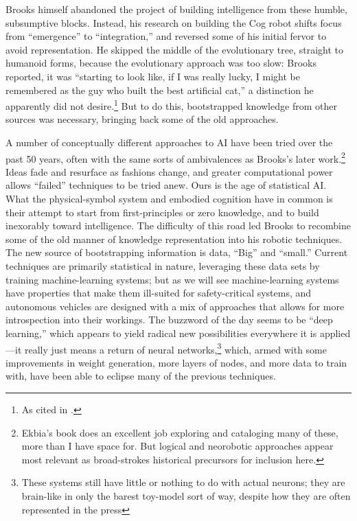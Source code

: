 Brooks himself abandoned the project of building intelligence from
these humble, subsumptive blocks. Instead, his research on building
the Cog robot shifts focus from ``emergence'' to ``integration,'' and
reversed some of his initial fervor to avoid representation.\cite[p.
  258]{ekbia} He skipped the middle of the evolutionary tree, straight
to humanoid forms, because the evolutionary approach was too slow: 
Brooks reported, it was ``starting to look like, if I was really
lucky, I might be remembered as the guy who built the best artificial
cat,'' a distinction he apparently did not desire.\cite[p.
  65]{brooksflesh}\footnote{As cited in \cite[p. 258]{ekbia}.}
But to do this, bootstrapped knowledge from other sources was
necessary, bringing back some of the old approaches.

A number of conceptually different approaches to AI have been tried
over the past 50 years, often with the same sorts of ambivalences as
Brooks's later work.\footnote{Ekbia's book does an excellent job
  exploring and cataloging many of these, more than I have space for.
  But logical and neorobotic approaches appear most relevant as
  broad-strokes historical precursors for inclusion here.} Ideas fade
and resurface as fashions change, and greater computational power
allows ``failed'' techniques to be tried anew. Ours is the age of
statistical AI. What the physical-symbol system and embodied cognition
have in common is their attempt to start from first-principles or zero
knowledge, and to build inexorably toward intelligence. The difficulty
of this road led Brooks to recombine some of the old manner of
knowledge representation into his robotic techniques. The new source
of bootstrapping information is data, ``Big'' and ``small.'' Current
techniques are primarily statistical in nature, leveraging these data
sets by training machine-learning systems; but as we will see
machine-learning systems have properties that make them ill-suited for
safety-critical systems, and autonomous vehicles are designed with a
mix of approaches that allows for more introspection into their
workings. The buzzword of the day seems to be ``deep learning,'' which
appears to yield radical new possibilities everywhere it is
applied---it really just means a return of neural
networks,\footnote{These systems still have little or nothing to do
  with actual neurons; they are brain-like in only the barest
  toy-model sort of way, despite how they are often represented in the
  press} which, armed with some improvements in weight generation, more layers of
nodes, and more data to train with, have been able to eclipse many of
the previous techniques\cite{???}.

